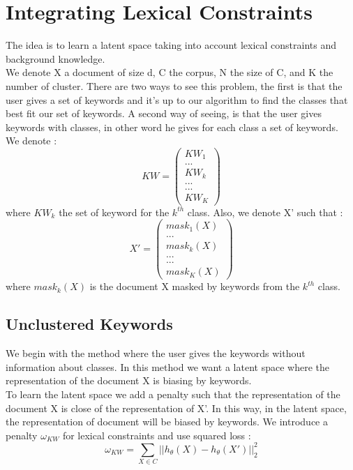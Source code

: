 \section{Integrating Lexical Constraints}
The idea is to learn a latent space taking into account lexical constraints and
background knowledge.
\\We denote  X a document of size d,
C the corpus, N the size of C, and K the number of cluster.
There are two ways to see this problem, the first is that the user gives a set 
of keywords and it's up to our algorithm to find the classes that best fit our 
set of keywords. A second way of seeing, is that the user gives keywords with 
classes, in other word he gives for each class a set of keywords.\\
We denote :
\begin{equation}
KW = \begin{pmatrix}KW_1  \\ ... \\ KW_k \\ ...\\ ... \\ KW_{K}\end{pmatrix}
\end{equation}
where $KW_k$ the set of keyword for the $k^{th}$ class. Also, we denote X' such that :
\begin{equation}
X' = \begin{pmatrix}mask_1(X)  \\ ... \\ mask_k(X) \\ ...\\ ... \\ mask_K(X)\end{pmatrix}
\end{equation}
where $mask_k(X)$ is the document X masked by keywords from the $k^{th}$ class.
\subsection{Unclustered Keywords}
We begin with the method where the user gives the keywords without information
about classes. In this method we want a latent space where the representation
of the document X is biasing by keywords.\\
To learn the latent space we add a penalty such that the representation
of the document X is close of the representation of X'. In this way, in the
latent space, the representation of document will be biased by keywords.
We introduce a penalty $\omega_{KW}$ for lexical constraints and
use squared loss : 
\begin{equation}\label{eq:omega1}
  \omega_{KW} = \sum\limits_{X \in C} || h_\theta(X) - h_\theta(X')||_2^2
\end{equation}

